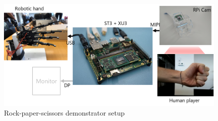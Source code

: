 \begin{itemize}
	\begin{figure}[!htb]
	\centering
		\includegraphics[width=\textwidth]{bilder/demonstrator.png}
		\caption{Rock-paper-scissors demonstrator setup}
		\label{fig:demonstrator}
	\end{figure}
\end{itemize}